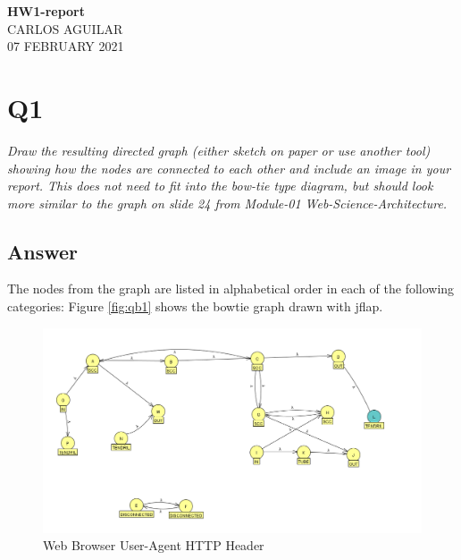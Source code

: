 \documentclass[12pt]{article}
\begin{document}
\begin{centering}
{\large\textbf{HW1-report}}\\ %
CARLOS AGUILAR\\                     %
07 FEBRUARY 2021\\                      %
\end{centering}


\section*{Q1}
\emph{
Draw the resulting directed graph (either sketch on paper or use another tool) showing how the nodes are connected to each other and include an image in your report. This does not need to fit into the bow-tie type diagram, but should look more similar to the graph on slide 24 from Module-01 Web-Science-Architecture.}

\subsection*{Answer}
The nodes from the graph are listed in alphabetical order in each of the following categories:
Figure \ref{fig:qb1} shows the bowtie graph drawn with jflap.

\begin{figure}[h!]
    \centering
    \includegraphics[clip, width=\textwidth] {bowtie}
    \caption{Web Browser User-Agent HTTP Header}
    \label{fig:bowtie}
\end{figure}
\end{document}
